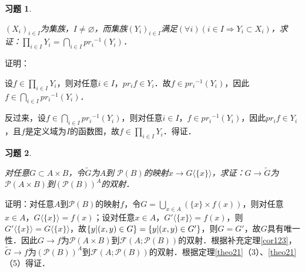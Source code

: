 \documentclass[12pt, a4paper, oneside]{book}
\newtheorem{exer}{习题}
\begin{document}
			\begin{exer}\label{exer64}
				\hfill\par
				$(X_i)_{i\in I}$为集族，$I\neq \varnothing$，而集族$(Y_i)_{i\in I}$满足$(\forall i)(i\in I\Rightarrow Y_i\subset X_i)$，求证：$\prod\limits_{i\in I}Y_i=\bigcap\limits_{i\in I}{pr_i}^{-1}(Y_i)$．
			\end{exer}
			证明：
			\par
			设$f\in \prod\limits_{i\in I}Y_i$，则对任意$i\in I$，$pr_if\in Y_i$．故$f\in {pr_i}^{-1}(Y_i)$，因此$f\in \bigcap\limits_{i\in I}{pr_i}^{-1}(Y_i)$．
			\par
			反过来，设$f\in \bigcap\limits_{i\in I}{pr_i}^{-1}(Y_i)$，则对任意$i\in I$，$f\in {pr_i}^{-1}(Y_i)$，因此$pr_if\in Y_i$，且$f$是定义域为$I$的函数图，故$f\in \prod\limits_{i\in I}Y_i$．得证．
			
			\begin{exer}\label{exer65}
				\hfill\par
				对任意$G\subset A\times B$，令$\tilde{G}$为$A$到 $\mathcal{P}(B)$的映射$x\to G\langle \{x\} \rangle $，求证：$G\to \tilde{G}$为 $\mathcal{P}(A\times B)$到$( \mathcal{P}(B))^A$的双射．
			\end{exer}
			证明：对任意$A$到$\mathcal{P}(B)$的映射$f$，令$G=\bigcup\limits_{x\in A}(\{x\}\times f(x))$，则对任意$x\in A$，$G\langle \{x\} \rangle =f(x)$；设对任意$x\in A$，$G'\langle \{x\} \rangle =f(x)$，则$G'\langle \{x\} \rangle =G\langle \{x\} \rangle $，故$\{y|(x, y)\in G\}=\{y|(x, y)\\\in G'\}$，则$G=G'$，故$G$具有唯一性．因此$G\to f$为$\mathcal{P}(A\times B)$到$\mathcal{F}(A; \mathcal{P}(B))$的双射．根据补充定理\ref{cor123}，$\tilde{G}\to f$为$( \mathcal{P}(B))^A$到$\mathcal{F}(A; \mathcal{P}(B))$的双射．根据定理\ref{theo21}（3）、\ref{theo21}（5）得证．
			
\end{document}
